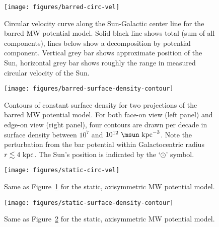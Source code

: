 \documentclass[letterpaper,12pt,preprint]{aastex}
\begin{document}



\clearpage
\begin{figure}[p]
\begin{center}
\texttt{[image: figures/barred-circ-vel]}
\caption{Circular velocity curve along the Sun-Galactic center line for the barred MW potential model. Solid black line shows total (sum of all components), lines below show a decomposition by potential component. Vertical grey bar shows approximate position of the Sun, horizontal grey bar shows roughly the range in measured circular velocity of the Sun.}
\label{fig:circ-vel-barred}
\end{center}
\end{figure}

\clearpage
\begin{figure}[p]
\begin{center}
\texttt{[image: figures/barred-surface-density-contour]}
\caption{Contours of constant surface density for two projections of the barred MW potential model. For both face-on view (left panel) and edge-on view (right panel), four contours are drawn per decade in surface density between $10^7$ and $10^{12}~\msun~{\rm kpc}^{-3}$. Note the perturbation from the bar potential within Galactocentric radius $r \lesssim 4~{\rm kpc}$. The Sun's position is indicated by the `$\odot$' symbol.}
\label{fig:surface-density-barred}
\end{center}
\end{figure}

\clearpage
\begin{figure}[p]
\begin{center}
\texttt{[image: figures/static-circ-vel]}
\caption{Same as Figure~\ref{fig:circ-vel-barred} for the static, axisymmetric MW potential model. }
\label{fig:circ-vel-static}
\end{center}
\end{figure}

\clearpage
\begin{figure}[p]
\begin{center}
\texttt{[image: figures/static-surface-density-contour]}
\caption{Same as Figure~\ref{fig:surface-density-barred} for the static, axisymmetric MW potential model. }
\label{fig:surface-density-static}
\end{center}
\end{figure}
\end{document}
